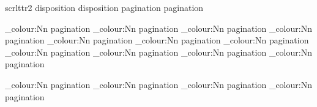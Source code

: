 \@ifclassloaded
	{ scrlttr2 }
	{ } {
		\addtokomafont
			{ disposition } {
				\colour
					{ disposition }}
	}
\addtokomafont
	{ pagination } {
		\colour
			{ pagination }}

\caoutchouc_colour:Nn
	\thepart
	{ pagination }
\caoutchouc_colour:Nn
	\thechapter
	{ pagination }
\caoutchouc_colour:Nn
	\thesection
	{ pagination }
\caoutchouc_colour:Nn
	\thesubsection
	{ pagination }
\caoutchouc_colour:Nn
	\thesubsubsection
	{ pagination }
\caoutchouc_colour:Nn
	\theparagraph
	{ pagination }
\caoutchouc_colour:Nn
	\thesubparagraph
	{ pagination }
\caoutchouc_colour:Nn
	\thefigure
	{ pagination }
\caoutchouc_colour:Nn
	\thetable
	{ pagination }
\caoutchouc_colour:Nn
	\thefootnote
	{ pagination }
\caoutchouc_colour:Nn
	\thempfootnote
	{ pagination }

\caoutchouc_colour:Nn
	{ pagination }
\caoutchouc_colour:Nn
	{ pagination }
\caoutchouc_colour:Nn
	{ pagination }
\caoutchouc_colour:Nn
	{ pagination }
